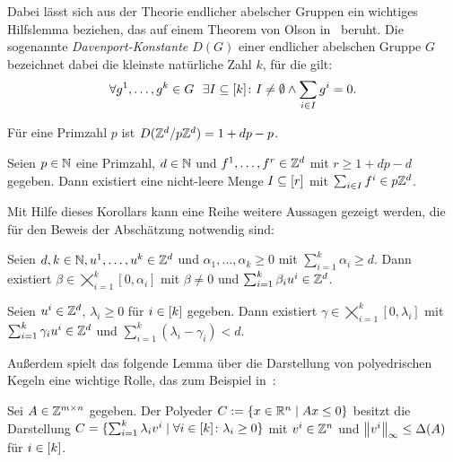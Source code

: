 Dabei lässt sich aus der Theorie endlicher abelscher Gruppen ein wichtiges Hilfslemma beziehen, das auf einem Theorem von Olson in~\cite{Olson1969} beruht.
Die sogenannte \emph{Davenport-Konstante $D(G)$} einer endlicher abelschen Gruppe $G$ bezeichnet dabei die kleinste natürliche Zahl $k$, für die gilt:
$$
\forall g^1,\dots,g^k \in G~~\exists I\subseteq[k]\colon I\neq\emptyset \wedge \sum_{i\in I}g^i=0 .
$$
\begin{theorem}[Olson, 1969]
	Für eine Primzahl $p$ ist $D(\mathbb{Z}^d/p\mathbb{Z}^d)=1+dp-p$.
\end{theorem}
\begin{corollary}
	Seien $p\in\mathbb{N}$ eine Primzahl, $d\in\mathbb{N}$ und $f^1,\dots,f^r\in\mathbb{Z}^d$ mit $r\geq 1+dp-d$ gegeben.
	Dann existiert eine nicht-leere Menge $I\subseteq[r]$ mit $\sum_{i\in I}f^i\in p\mathbb{Z}^d$.
\end{corollary}

Mit Hilfe dieses Korollars kann eine Reihe weitere Aussagen gezeigt werden, die für den Beweis der Abschätzung notwendig sind:

\begin{lemma}\label{lem:olson}
	Seien $d,k\in\mathbb{N}, u^1,\dots, u^k\in\mathbb{Z}^d$ und $\alpha_1,\dots,\alpha_k\geq0$ mit $\sum_{i=1}^k \alpha_i\geq d$.
	Dann existiert $\beta\in\bigtimes_{i=1}^k[0,\alpha_i]$ mit $\beta\neq0$ und $\sum_{i=1}^k\beta_i u^i \in\mathbb{Z}^d$.
\end{lemma}

\begin{lemma}\label{lem:maxgamma}
	Seien $u^i\in\mathbb{Z}^d$, $\lambda_i\geq0$ für $i\in[k]$ gegeben.
	Dann existiert $\gamma\in\bigtimes_{i=1}^k [0,\lambda_i]$ mit $\sum_{i=1}^k \gamma_i u^i\in\mathbb{Z}^d$ und  $\sum_{i=1}^k(\lambda_i-\gamma_i)<d$.
\end{lemma}

Außerdem spielt das folgende Lemma über die Darstellung von polyedrischen Kegeln eine wichtige Rolle, das zum Beispiel in~\cite{bibid}:

\begin{lemma}
	Sei $A\in\mathbb{Z}^{m\times n}$ gegeben.
	Der Polyeder $C:=\{ x\in\mathbb{R}^n \mid A x\leq 0 \}$ besitzt die Darstellung $C=\{\sum_{i=1}^k\lambda_i v^i \mid \forall i\in[k] \colon\lambda_i\geq0 \}$ mit $v^i\in\mathbb{Z}^n$ und $\left\lVert v^i\right\rVert_\infty\leq\Delta(A)$ für $i\in[k]$.
\end{lemma}